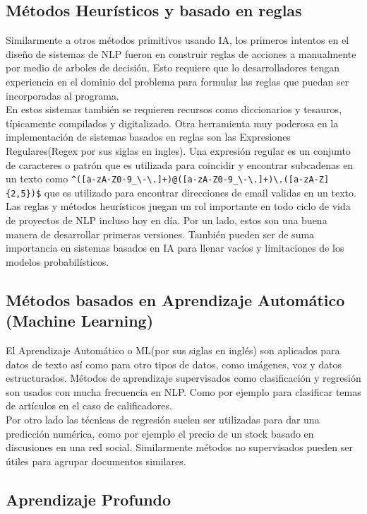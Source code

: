 \subsection{Métodos Heurísticos y basado en reglas}

Similarmente a otros métodos primitivos usando IA, los primeros intentos en el diseño de sistemas
de NLP fueron
en construir reglas de acciones a manualmente por medio de arboles de decisión. Esto requiere que
lo desarrolladores tengan
experiencia en el dominio
del problema para formular las reglas que puedan ser incorporadas al programa.\\
En estos sistemas también se requieren recursos como diccionarios y tesauros, típicamente
compilados y digitalizado. Otra
herramienta muy poderosa en la implementación de sistemas basados en reglas son las Expresiones
Regulares(Regex por sus
siglas en ingles). Una expresión regular es un conjunto de caracteres o patrón que es utilizada
para coincidir y
encontrar subcadenas en un texto como
\verb|^([a-zA-Z0-9_\-\.]+)@([a-zA-Z0-9_\-\.]+)\.([a-zA-Z]{2,5})$|
que es utilizado para encontrar direcciones de email validas en un texto.\\
Las reglas y métodos heurísticos juegan un rol importante en todo ciclo de vida de proyectos de NLP
incluso hoy en día. Por un lado, estos son una buena manera de desarrollar primeras versiones. También pueden ser de
suma importancia en
sistemas basados en IA para llenar vacíos y limitaciones de los modelos probabilísticos.
\cite{sowmya_practical_npl}

\subsection{Métodos basados en Aprendizaje Automático (Machine Learning)}
El Aprendizaje Automático o ML(por sus siglas en inglés) son aplicados para datos de texto así como
para otro tipos de datos, como imágenes, voz y datos estructurados. Métodos de aprendizaje
supervisados como clasificación y
regresión son usados con mucha frecuencia en NLP. Como por ejemplo para
clasificar temas de
artículos en el caso de calificadores.\\
Por otro lado las técnicas de regresión suelen ser utilizadas para dar una predicción numérica,
como por ejemplo el precio
de un stock basado en discusiones en una red social. Similarmente métodos no supervisados pueden ser
útiles para
agrupar documentos similares.
\subsection{Aprendizaje Profundo}

